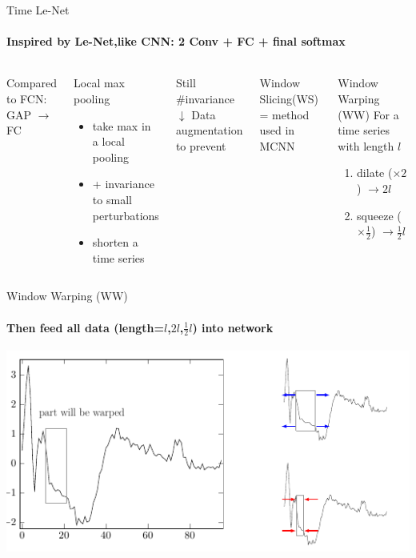 \documentclass[aspectratio=169]{ctexbeamer}
\begin{document}
\begin{frame}{Time Le-Net}
\framesubtitle{Inspired by Le-Net,like CNN: 2 Conv + FC + final softmax}
\begin{columns}
	Compared to FCN:\\
	GAP $\to$ {\color{red}FC}
	\begin{block}{Local max pooling}
		\begin{itemize}
			\item take max in a local pooling
			\item + invariance to small perturbations
			\item shorten a time series
		\end{itemize}
	\end{block}
	Still {\color{red}{\#parameters $\uparrow$}} \#invariance $\downarrow$
	Data augmentation to prevent {\color{red}{overfitting}}
	{\color{gray}{especially on relatively small datasets}}
	\begin{block}{Window Slicing(WS)}
		= method used in MCNN
	\end{block}
	\begin{block}{Window Warping (WW)}
		For a time series with length $l$
		\begin{enumerate}
			\item dilate ($\times 2$) $\to 2l$
			\item squeeze ($\times \frac{1}{2}$) $\to \frac{1}{2}l$
 		\end{enumerate}
	\end{block}
\end{columns}
\end{frame}

\begin{frame}{Window Warping (WW)}
	\framesubtitle{Then feed all data (length=$l$,$2l$,$\frac{1}{2}l$) into network}
	\begin{center}
		\includegraphics[width=.9\textwidth]{figure/ww}
	\end{center}
\end{frame}
\end{document}

